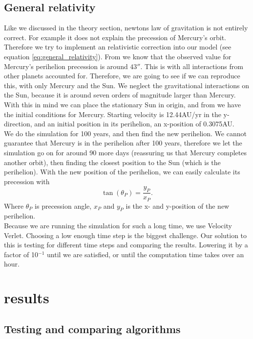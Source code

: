 \documentclass[reprint, english,notitlepage,nofootinbib]{revtex4-1}  %
\begin{document}
\subsection{General relativity}
Like we discussed in the theory section, newtons law of gravitation is not entirely correct. For example it does not explain the precession of Mercury's orbit. Therefore we try to implement an relativistic correction into our model (see equation \eqref{eq:general_relativity}). From \citep{oppgavetekst} we know that the observed value for Mercury's perihelion precession is around $43''$. This is with all interactions from other planets accounted for. Therefore, we are going to see if we can reproduce this, with only Mercury and the Sun. We neglect the gravitational interactions on the Sun, because it is around seven orders of magnitude larger than Mercury. With this in mind we can place the stationary Sun in origin, and from \citep{oppgavetekst} we have the initial conditions for Mercury. Starting velocity is 12.44AU/yr in the y-direction, and an initial position in its perihelion, an x-position of 0.3075AU.
\\
We do the simulation for 100 years, and then find the new perihelion. We cannot guarantee that Mercury is in the perihelion after 100 years, therefore we let the simulation go on for around 90 more days (reassuring us that Mercury completes another orbit), then finding the closest position to the Sun (which is the perihelion). With the new position of the perihelion, we can easily calculate its precession with
\begin{equation*}
	\tan(\theta_P) = \frac{y_P}{x_P}.
\end{equation*}
Where $\theta_P$ is precession angle, $x_P$ and $y_P$ is the x- and y-position of the new perihelion.
\\
Because we are running the simulation for such a long time, we use Velocity Verlet. Choosing a low enough time step is the biggest challenge. Our solution to this is testing for different time steps and comparing the results. Lowering it by a factor of 10$^{-1}$ until we are satisfied, or until the computation time takes over an hour.

\section{results}

\subsection{Testing and comparing algorithms}
\end{document}

